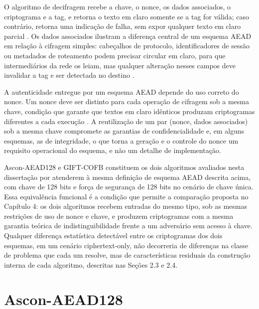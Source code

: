 

O algoritmo de decifragem recebe a chave, o nonce, os dados associados, o criptograma e a tag, e retorna o texto em claro somente se a tag for válida; caso contrário, retorna uma indicação de falha, sem expor qualquer texto em claro parcial \cite{nist_sp800232_2025}. Os dados associados ilustram a diferença central de um esquema AEAD em relação à cifragem simples: cabeçalhos de protocolo, identificadores de sessão ou metadados de roteamento podem precisar circular em claro, para que intermediários da rede os leiam, mas qualquer alteração nesses campos deve invalidar a tag e ser detectada no destino \cite{nist_sp800232_2025}.

A autenticidade entregue por um esquema AEAD depende do uso correto do nonce. Um nonce deve ser distinto para cada operação de cifragem sob a mesma chave, condição que garante que textos em claro idênticos produzam criptogramas diferentes a cada execução \cite{nist_sp800232_2025}. A reutilização de um par (nonce, dados associados) sob a mesma chave compromete as garantias de confidencialidade e, em alguns esquemas, as de integridade, o que torna a geração e o controle do nonce um requisito operacional do esquema, e não um detalhe de implementação.

Ascon-AEAD128 e GIFT-COFB constituem os dois algoritmos avaliados nesta dissertação por atenderem à mesma definição de esquema AEAD descrita acima, com chave de 128 bits e força de segurança de 128 bits no cenário de chave única. Essa equivalência funcional é a condição que permite a comparação proposta no Capítulo 4: os dois algoritmos recebem entradas do mesmo tipo, sob as mesmas restrições de uso de nonce e chave, e produzem criptogramas com a mesma garantia teórica de indistinguibilidade frente a um adversário sem acesso à chave. Qualquer diferença estatística detectável entre os criptogramas dos dois esquemas, em um cenário ciphertext-only, não decorreria de diferenças na classe de problema que cada um resolve, mas de características residuais da construção interna de cada algoritmo, descritas nas Seções 2.3 e 2.4.


\section{Ascon-AEAD128}

